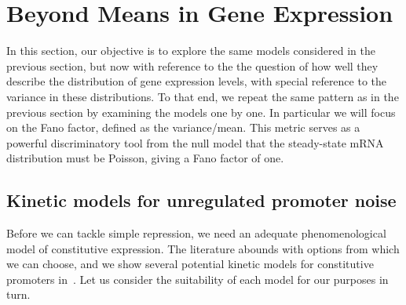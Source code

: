 \section{Beyond Means in Gene Expression}
\label{sec:beyond_means}
 
In this section, our objective is to explore the same models considered in the
previous section, but now with reference to the the question of how well they
describe the distribution of gene expression levels, with special reference to
the variance in these distributions. To that end, we repeat the same pattern as
in the previous section by examining the models one by one. In particular
we will focus on the Fano factor, defined as the variance/mean. This metric
serves as a powerful discriminatory tool from the null model that the
steady-state mRNA distribution must be Poisson, giving a Fano factor of one.

\subsection{Kinetic models for unregulated promoter noise}

Before we can tackle simple repression, we need an adequate phenomenological
model of constitutive expression. The literature abounds with options from which
we can choose, and we show several potential kinetic models for constitutive
promoters in~. Let us consider the suitability of
each model for our purposes in turn.

